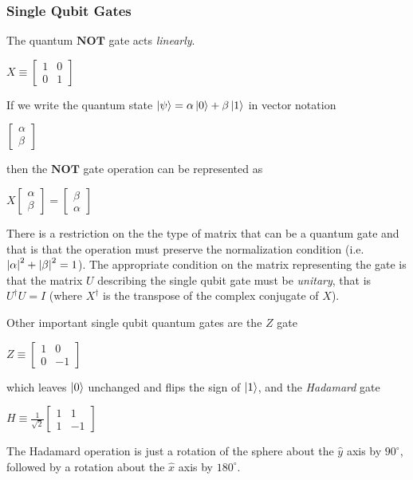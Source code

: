 \documentclass{article}
\begin{document}
\subsubsection{Single Qubit Gates}
The quantum $\mathbf{NOT}$ gate acts \emph{linearly}.
\begin{center}
  $\mathit{X} \equiv \begin{bmatrix}
     1 & 0 \\
     0 & 1
   \end{bmatrix}$
\end{center}
If we write the quantum state $\ket{\psi} = \alpha\ket{0} + \beta\ket{1}$ in
vector notation
\begin{center}
    $\begin{bmatrix}
       \alpha \\
       \beta
     \end{bmatrix}$
\end{center}
then the $\mathbf{NOT}$ gate operation can be represented as
\begin{center}
  $\mathit{X} \begin{bmatrix}
     \alpha \\
     \beta
   \end{bmatrix} = \begin{bmatrix}
     \beta \\
     \alpha
   \end{bmatrix}$
\end{center}
There is a restriction on the the type of matrix that can be a quantum gate and
that is that the operation must preserve the normalization condition (i.e.
$\abs{\alpha}^{2} + \abs{\beta}^{2} = 1$). The appropriate condition on the
matrix representing the gate is that the matrix $\mathit{U}$ describing the
single qubit gate must be \emph{unitary}, that is
$\mathit{U}^{\dagger}\mathit{U} = \mathit{I}$ (where $\mathit{X}^{\dagger}$
is the transpose of the complex conjugate of $\mathit{X}$).

Other important single qubit quantum gates are the $\mathit{Z}$ gate
\begin{center}
  $\mathit{Z} \equiv \begin{bmatrix}
    1 & 0 \\
    0 & -1
  \end{bmatrix}$
\end{center}
which leaves $\ket{0}$ unchanged and flips the sign of $\ket{1}$, and the
\emph{Hadamard} gate
\begin{center}
  $\mathit{H} \equiv \frac{1}{\sqrt{2}}\begin{bmatrix}
    1 & 1 \\
    1 & -1
  \end{bmatrix}$
\end{center}
The Hadamard operation is just a rotation of the sphere about the $\hat{y}$
axis by $90^{\circ}$, followed by a rotation about the $\hat{x}$ axis by
$180^{\circ}$.
\end{document}
